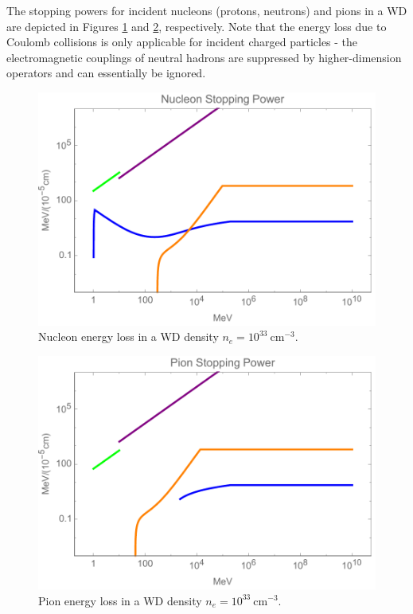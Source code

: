 \documentclass[twocolumn,showpacs,preprintnumbers,amsmath,amssymb,prd]{revtex4}
\begin{document}
The stopping powers for incident nucleons (protons, neutrons) and pions in a WD are depicted in Figures \ref{fig:SPnuc} and \ref{fig:SPpion}, respectively. Note that the energy loss due to Coulomb collisions is only applicable for incident charged particles - the electromagnetic couplings of neutral hadrons are suppressed by higher-dimension operators and can essentially be ignored.
\begin{figure}
\includegraphics[scale=.45]{SPnucleon.pdf}
\caption{Nucleon energy loss in a WD density $n_e = 10^{33} ~\text{cm}^{-3}$.}
\label{fig:SPnuc}
\end{figure}

\begin{figure}
\includegraphics[scale=.45]{SPpion.pdf}
\caption{Pion energy loss in a WD density $n_e = 10^{33} ~\text{cm}^{-3}$.}
\label{fig:SPpion}
\end{figure}
\end{document}
